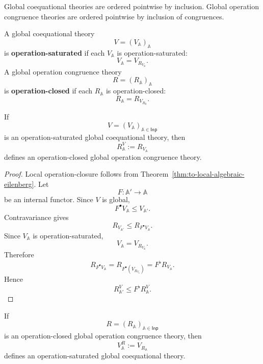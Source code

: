 Global coequational theories are ordered pointwise by inclusion. Global
operation congruence theories are ordered pointwise by inclusion of
congruences.

\begin{definition}
\label{def:to-global-operation-saturation-closure}
    A global coequational theory
    \[
        V=(V_{\mathbb A})_{\mathbb A}
    \]
    is \textbf{operation-saturated} if each \(V_{\mathbb A}\) is
    operation-saturated:
    \[
        V_{\mathbb A}=V_{R_{V_{\mathbb A}}}.
    \]
    A global operation congruence theory
    \[
        R=(R_{\mathbb A})_{\mathbb A}
    \]
    is \textbf{operation-closed} if each \(R_{\mathbb A}\) is operation-closed:
    \[
        R_{\mathbb A}=R_{V_{R_{\mathbb A}}}.
    \]
\end{definition}

\begin{proposition}
\label{prop:to-saturated-global-theories-to-closed-global-congruences}
    If
    \[
        V=(V_{\mathbb A})_{\mathbb A\in\mathsf{Inp}}
    \]
    is an operation-saturated global coequational theory, then
    \[
        R^V_{\mathbb A}:=R_{V_{\mathbb A}}
    \]
    defines an operation-closed global operation congruence theory.
\end{proposition}

\begin{proof}
    Local operation-closure follows from
    Theorem~\ref{thm:to-local-algebraic-eilenberg}. Let
    \[
        F:\mathbb A'\to\mathbb A
    \]
    be an internal functor. Since \(V\) is global,
    \[
        F^\bullet V_{\mathbb A}\leq V_{\mathbb A'}.
    \]
    Contravariance gives
    \[
        R_{V_{\mathbb A'}}
        \leq
        R_{F^\bullet V_{\mathbb A}}.
    \]
    Since \(V_{\mathbb A}\) is operation-saturated,
    \[
        V_{\mathbb A}=V_{R_{V_{\mathbb A}}}.
    \]
    Therefore
    \[
        R_{F^\bullet V_{\mathbb A}}
        =
        R_{F^\bullet(V_{R_{V_{\mathbb A}}})}
        =
        F^\flat R_{V_{\mathbb A}}.
    \]
    Hence
    \[
        R^V_{\mathbb A'}\leq F^\flat R^V_{\mathbb A}.
    \]
\end{proof}

\begin{proposition}
\label{prop:to-closed-global-congruences-to-saturated-global-theories}
    If
    \[
        R=(R_{\mathbb A})_{\mathbb A\in\mathsf{Inp}}
    \]
    is an operation-closed global operation congruence theory, then
    \[
        V^R_{\mathbb A}:=V_{R_{\mathbb A}}
    \]
    defines an operation-saturated global coequational theory.
\end{proposition}

